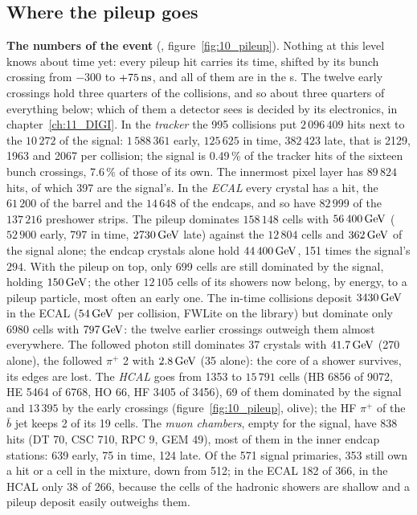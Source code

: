 \subsection{Where the pileup goes}
\label{sec:10_pileup}

\textbf{The numbers of the event} (, figure~\ref{fig:10_pileup}). Nothing at
this level knows about time yet: every pileup hit carries its time, shifted by its bunch crossing from $-300$ to
$+75\,\mathrm{ns}$, and all of them are in the s. The twelve early crossings hold three quarters of the
collisions, and so about three quarters of everything below; which of them a detector sees is decided by its
electronics, in chapter~\ref{ch:11_DIGI}. In the \emph{tracker} the 995 collisions put $2\,096\,409$ hits next to the
$10\,272$ of the signal: $1\,588\,361$ early, $125\,625$ in time, $382\,423$ late, that is 2129, 1963 and 2067 per
collision; the signal is 0.49\,\% of the tracker hits of the sixteen bunch crossings, 7.6\,\% of those of its own.
The innermost pixel layer has $89\,824$ hits, of which 397 are the signal's. In the \emph{ECAL} every crystal has a
hit, the $61\,200$ of the barrel and the $14\,648$ of the endcaps, and so have $82\,999$ of the $137\,216$ preshower
strips. The pileup dominates $158\,148$ cells with $56\,400\,\mathrm{GeV}$ ($52\,900$ early, 797 in time, $2730\,\mathrm{GeV}$ late)
against the $12\,804$ cells and $362\,\mathrm{GeV}$ of the signal alone; the endcap crystals alone hold $44\,400\,\mathrm{GeV}$, 151
times the signal's $294$. With the pileup on top, only 699 cells are still dominated by the signal, holding
$150\,\mathrm{GeV}$; the other $12\,105$ cells of its showers now belong, by energy, to a pileup particle, most often an early
one. The in-time collisions deposit $3430\,\mathrm{GeV}$ in the ECAL ($54\,\mathrm{GeV}$ per collision, FWLite on the library) but
dominate only 6980 cells with $797\,\mathrm{GeV}$: the twelve earlier crossings outweigh them almost everywhere. The followed
photon still dominates 37 crystals with $41.7\,\mathrm{GeV}$ (270 alone), the followed $\pi^+$ 2 with $2.8\,\mathrm{GeV}$ (35 alone): the
core of a shower survives, its edges are lost. The \emph{HCAL} goes from 1353 to $15\,791$ cells (HB 6856 of 9072, HE
5464 of 6768, HO 66, HF 3405 of 3456), 69 of them dominated by the signal and $13\,395$ by the early crossings
(figure~\ref{fig:10_pileup}, olive); the HF $\pi^+$ of the $\bar b$ jet keeps 2 of its 19 cells. The \emph{muon
chambers}, empty for the signal, have 838 hits (DT 70, CSC 710, RPC 9, GEM 49), most of them in the inner endcap
stations: 639 early, 75 in time, 124 late. Of the 571 signal primaries, 353 still own a hit or a cell in the mixture,
down from 512; in the ECAL 182 of 366, in the HCAL only 38 of 266, because the cells of the hadronic showers are
shallow and a pileup deposit easily outweighs them.


